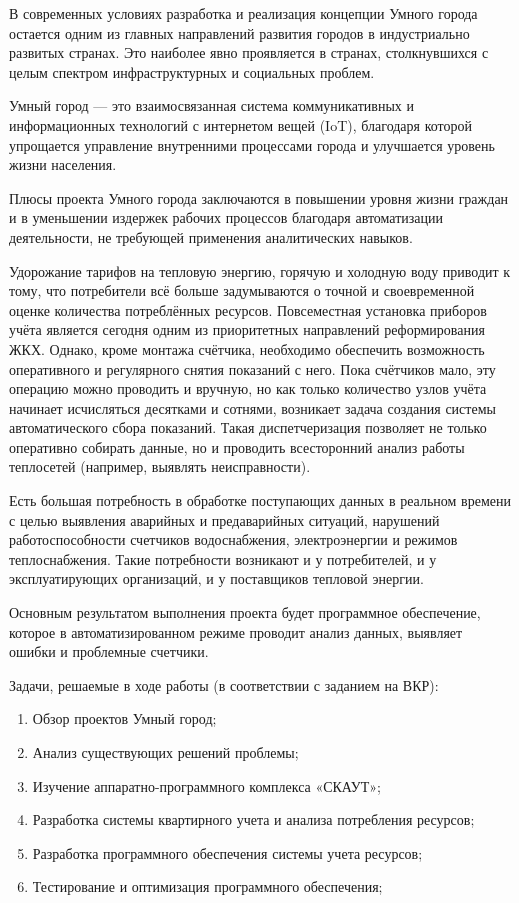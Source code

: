 
В современных условиях разработка и реализация концепции Умного города остается одним из главных направлений развития городов в индустриально развитых странах. Это наиболее явно проявляется в странах, столкнувшихся с целым спектром инфраструктурных и социальных проблем. 

Умный город --- это взаимосвязанная система коммуникативных и информационных технологий с интернетом вещей (IoT), благодаря которой упрощается управление внутренними процессами города и улучшается уровень жизни населения.

Плюсы проекта Умного города заключаются в повышении уровня жизни граждан и в уменьшении издержек рабочих процессов благодаря автоматизации деятельности, не требующей применения аналитических навыков.

Удорожание тарифов на тепловую энергию, горячую и холодную воду приводит к тому, что потребители всё больше задумываются о точной и своевременной оценке количества потреблённых ресурсов. Повсеместная установка приборов учёта является сегодня одним из приоритетных направлений реформирования ЖКХ. Однако, кроме монтажа счётчика, необходимо обеспечить возможность оперативного и регулярного снятия показаний с него. Пока счётчиков мало, эту операцию можно проводить и вручную, но как только количество узлов учёта начинает исчисляться десятками и сотнями, возникает задача создания системы автоматического сбора показаний. Такая диспетчеризация позволяет не только оперативно собирать данные, но и проводить всесторонний анализ работы теплосетей (например, выявлять неисправности).

Есть большая потребность в обработке поступающих данных в реальном времени с целью выявления аварийных и предаварийных ситуаций, нарушений работоспособности счетчиков водоснабжения, электроэнергии и режимов теплоснабжения. Такие потребности возникают и у потребителей, и у эксплуатирующих организаций, и у поставщиков тепловой энергии.

Основным результатом выполнения проекта будет программное обеспечение, которое в автоматизированном режиме проводит анализ данных, выявляет ошибки и проблемные счетчики.

Задачи, решаемые в ходе работы (в соответствии с заданием на ВКР):
\begin{enumerate}
	\item Обзор проектов Умный город;
	\item Анализ существующих решений проблемы;
	\item Изучение аппаратно-программного комплекса «СКАУТ»; 
	\item Разработка системы квартирного учета и анализа потребления ресурсов;
	\item Разработка программного обеспечения системы учета ресурсов;
	\item Тестирование и оптимизация программного обеспечения;	
\end{enumerate}